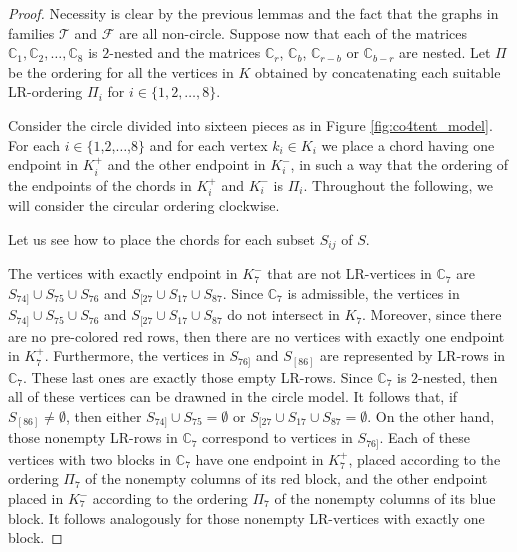 \documentclass[12pt]{book}
\theoremstyle{plain}
\theoremstyle{remark}
\begin{document}
\begin{proof}

Necessity is clear by the previous lemmas and the fact that the graphs in families $\mathcal{T}$ and $\mathcal{F}$ are all non-circle. Suppose now that each of the matrices $\mathbb C_1,\mathbb C_2,\ldots,\mathbb C_8$ is $2$-nested and the matrices $\mathbb C_r$, $\mathbb C_b$, $\mathbb C_{r-b}$ or $\mathbb C_{b-r}$ are nested.
Let $\Pi$ be the ordering for all the vertices in $K$ obtained by concatenating each suitable LR-ordering $\Pi_i$ for $i \in \{1, 2,\ldots, 8\}$.


Consider the circle divided into sixteen pieces as in Figure \ref{fig:co4tent_model}. For each $i\in\{1$,$2$,$\ldots$,$8\}$ and for each vertex $k_i \in K_i$ we place a chord having one endpoint in $K_i^+$ and the other endpoint in $K_i^-$, in such a way that the ordering of the endpoints of the chords in $K_i^+$ and $K_i^-$ is $\Pi_i$. Throughout the following, we will consider the circular ordering  clockwise.

Let us see how to place the chords for each subset $S_{ij}$ of $S$. 

The vertices with exactly endpoint in $K_7^{-}$ that are not LR-vertices in $\mathbb C_7$ are $S_{74]} \cup S_{75} \cup S_{76}$ and $S_{[27} \cup S_{17} \cup S_{87}$. Since $\mathbb C_7$ is admissible, the vertices in $S_{74]} \cup S_{75} \cup S_{76}$ and $S_{[27} \cup S_{17} \cup S_{87}$ do not intersect in $K_7$.
	Moreover, since there are no pre-colored red rows, then there are no vertices with exactly one endpoint in $K_7^{+}$.
	Furthermore, the vertices in $S_{76]}$ and $S_{[86]}$ are represented by LR-rows in $\mathbb C_7$. These last ones are exactly those empty LR-rows. Since $\mathbb C_7$ is $2$-nested, then all of these vertices can be drawned in the circle model. It follows that, if $S_{[86]} \neq \emptyset$, then either $S_{74]} \cup S_{75} = \emptyset$ or $S_{[27} \cup S_{17} \cup S_{87} = \emptyset$.
	On the other hand, those nonempty LR-rows in $\mathbb C_7$ correspond to vertices in $S_{76]}$. Each of these vertices with two blocks in $\mathbb C_7$ have one endpoint in $K_7^{+}$, placed according to the ordering $\Pi_7$ of the nonempty columns of its red block, and the other endpoint placed in $K_7^{-}$ according to the ordering $\Pi_7$ of the nonempty columns of its blue block. It follows analogously for those nonempty LR-vertices with exactly one block.  
	


\end{proof}
\end{document}
